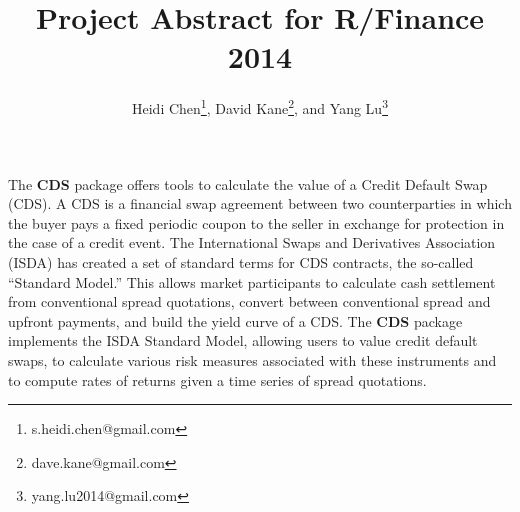 \documentclass[12pt]{article}
\title{Project Abstract for R/Finance 2014}
\author{Heidi Chen\thanks{s.heidi.chen@gmail.com}, David Kane\thanks{dave.kane@gmail.com}, and Yang Lu\thanks{yang.lu2014@gmail.com}}
\theoremstyle{plain}
\begin{document}
\vspace*{-3cm}
 {\let\newpage\relax\maketitle}


The \textbf{CDS} package offers tools to calculate the value of a
Credit Default Swap (CDS). A CDS is a financial swap agreement
between two counterparties in which the buyer pays a fixed periodic
coupon to the seller in exchange for protection in the case of a
credit event. The International Swaps and Derivatives Association
(ISDA) has created a set of standard terms for CDS
contracts, the so-called ``Standard Model.'' This allows market 
participants to calculate cash settlement from
conventional spread quotations, convert between conventional spread and upfront
payments, and build the yield curve of a CDS. The \textbf{CDS} package
implements the ISDA Standard Model, allowing users to value credit default swaps, 
to calculate various risk measures associated with these instruments and to compute 
rates of returns given a time series of spread quotations.
\end{document}
